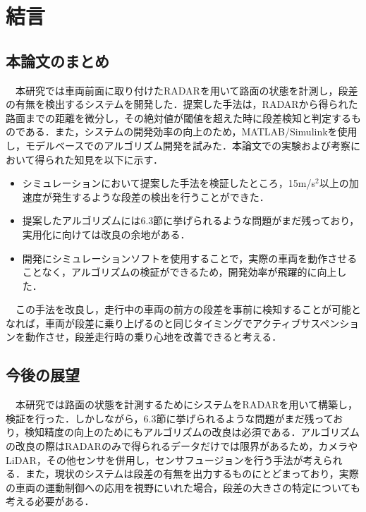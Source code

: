 \chapter{結言}

\section{本論文のまとめ}
　本研究では車両前面に取り付けたRADARを用いて路面の状態を計測し，段差の有無を検出するシステムを開発した．提案した手法は，RADARから得られた路面までの距離を微分し，その絶対値が閾値を超えた時に段差検知と判定するものである．また，システムの開発効率の向上のため，MATLAB/Simulinkを使用し，モデルベースでのアルゴリズム開発を試みた．本論文での実験および考察において得られた知見を以下に示す．
\begin{itemize}
    \item シミュレーションにおいて提案した手法を検証したところ，15m/s$^2$以上の加速度が発生するような段差の検出を行うことができた．
    \item 提案したアルゴリズムには6.3節に挙げられるような問題がまだ残っており，実用化に向けては改良の余地がある．
    \item 開発にシミュレーションソフトを使用することで，実際の車両を動作させることなく，アルゴリズムの検証ができるため，開発効率が飛躍的に向上した．
\end{itemize}

　この手法を改良し，走行中の車両の前方の段差を事前に検知することが可能となれば，車両が段差に乗り上げるのと同じタイミングでアクティブサスペンションを動作させ，段差走行時の乗り心地を改善できると考える．

\section{今後の展望}
　本研究では路面の状態を計測するためにシステムをRADARを用いて構築し，検証を行った．しかしながら，6.3節に挙げられるような問題がまだ残っており，検知精度の向上のためにもアルゴリズムの改良は必須である．アルゴリズムの改良の際はRADARのみで得られるデータだけでは限界があるため，カメラやLiDAR，その他センサを併用し，センサフュージョンを行う手法が考えられる．また，現状のシステムは段差の有無を出力するものにとどまっており，実際の車両の運動制御への応用を視野にいれた場合，段差の大きさの特定についても考える必要がある．
